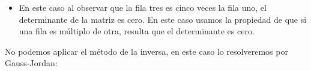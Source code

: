\documentclass[11pt]{article}
\begin{document}
\begin{enumerate}[\hspace{-5mm} 1) ]
\begin{enumerate}[i) ]

\begin{itemize}
    \item En este caso al observar que la fila tres es cinco veces la fila uno, el determinante de la matriz es cero. En este caso usamos la propiedad de que si una fila es múltiplo de otra, resulta que el determinante es cero.
\end{itemize}


\medskip 

No podemos aplicar el método de la inversa, en este caso lo resolveremos por Gauss-Jordan: 

\bigskip 


\end{enumerate}
\end{enumerate}
\end{document}
